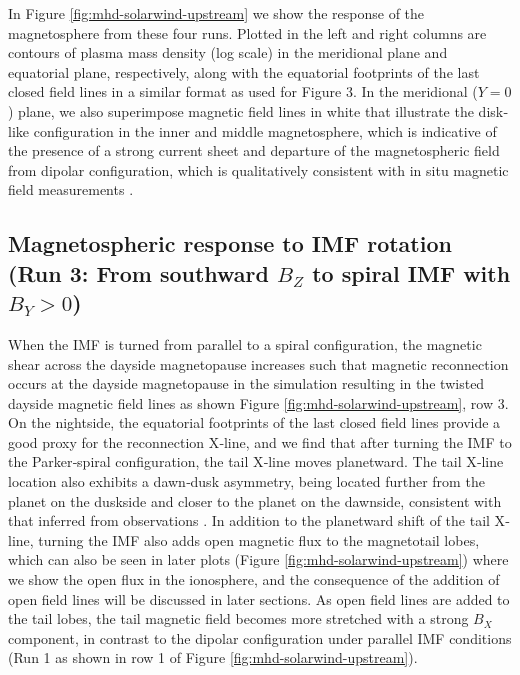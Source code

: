 In Figure \ref{fig:mhd-solarwind-upstream} we show the response of the magnetosphere from these four runs. Plotted in the left and right columns are contours of plasma mass density (log scale) in the meridional plane and equatorial plane, respectively, along with the equatorial footprints of the last closed field lines in a similar format as used for Figure 3. In the meridional ($Y = 0$) plane, we also superimpose magnetic field lines in white that illustrate the disk‐like configuration in the inner and middle magnetosphere, which is indicative of the presence of a strong current sheet and departure of the magnetospheric field from dipolar configuration, which is qualitatively consistent with in situ magnetic field measurements \cite{Khurana2001}.

\subsection{Magnetospheric response to IMF rotation (Run 3: From southward \texorpdfstring{$B_Z$}{Bz} to spiral IMF with \texorpdfstring{$B_Y > 0$}{By>0}) }

When the IMF is turned from parallel to a spiral configuration, the magnetic shear across the dayside magnetopause increases such that magnetic reconnection occurs at the dayside magnetopause in the simulation resulting in the twisted dayside magnetic field lines as shown Figure \ref{fig:mhd-solarwind-upstream}, row 3. On the nightside, the equatorial footprints of the last closed field lines provide a good proxy for the reconnection X‐line, and we find that after turning the IMF to the Parker‐spiral configuration, the tail X‐line moves planetward. The tail X‐line location also exhibits a dawn‐dusk asymmetry, being located further from the planet on the duskside and closer to the planet on the dawnside, consistent with that inferred from observations \cite{Vogt2010a,Vogt2014,Woch2002a}. In addition to the planetward shift of the tail X‐line, turning the IMF also adds open magnetic flux to the magnetotail lobes, which can also be seen in later plots (Figure \ref{fig:mhd-solarwind-upstream}) where we show the open flux in the ionosphere, and the consequence of the addition of open field lines will be discussed in later sections. As open field lines are added to the tail lobes, the tail magnetic field becomes more stretched with a strong $B_X$ component, in contrast to the dipolar configuration under parallel IMF conditions (Run 1 as shown in row 1 of Figure \ref{fig:mhd-solarwind-upstream}). 


